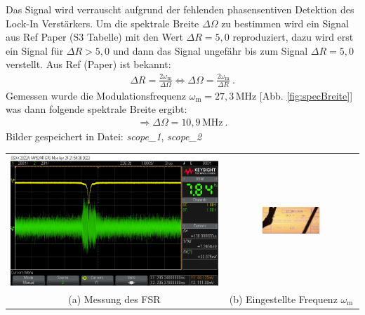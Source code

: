 Das Signal wird verrauscht aufgrund der fehlenden phasensentiven Detektion des Lock-In Verstärkers. Um die spektrale Breite $\Delta \Omega$ zu bestimmen wird ein Signal aus Ref Paper (S3 Tabelle) mit den Wert $\Delta R = 5,0$ reproduziert, dazu wird erst ein Signal für $\Delta R > 5,0$ und dann das Signal ungefähr bis zum Signal  $\Delta R = 5,0$ verstellt. Aus Ref (Paper) ist bekannt:
\begin{gather}
    \Delta R = \frac{2 \omega_\mathrm{m}}{\Delta \Omega} \Leftrightarrow \Delta \Omega = \frac{2 \omega_\mathrm{m}}{\Delta R}~.
\end{gather}
Gemessen wurde die Modulationsfrequenz $\omega_\mathrm{m} = 27,3$\,MHz [Abb. \ref{fig:specBreite}] was dann folgende spektrale Breite ergibt: 
\begin{gather}    
    \Rightarrow \boxed{\Delta \Omega = 10,9\,\mathrm{MHz}}~.
\end{gather}
Bilder gespeichert in Datei: \textit{scope\_1}, \textit{scope\_2}

\begin{center}
    \captionsetup{type=figure}
    \begin{tabular}{c c}
        \includegraphics[scale=0.25]{Bilder/Signal-Rausch/scope_2.png} & \includegraphics[width=0.45\textwidth]{Bilder/Signal-Rausch/signal-rausch_paper_hf-generator.jpg}\\
        (a) Messung des FSR & (b) Eingestellte Frequenz  $\omega_\mathrm{m}$ \\
    \end{tabular}
    \label{fig:specBreite}
\end{center}

